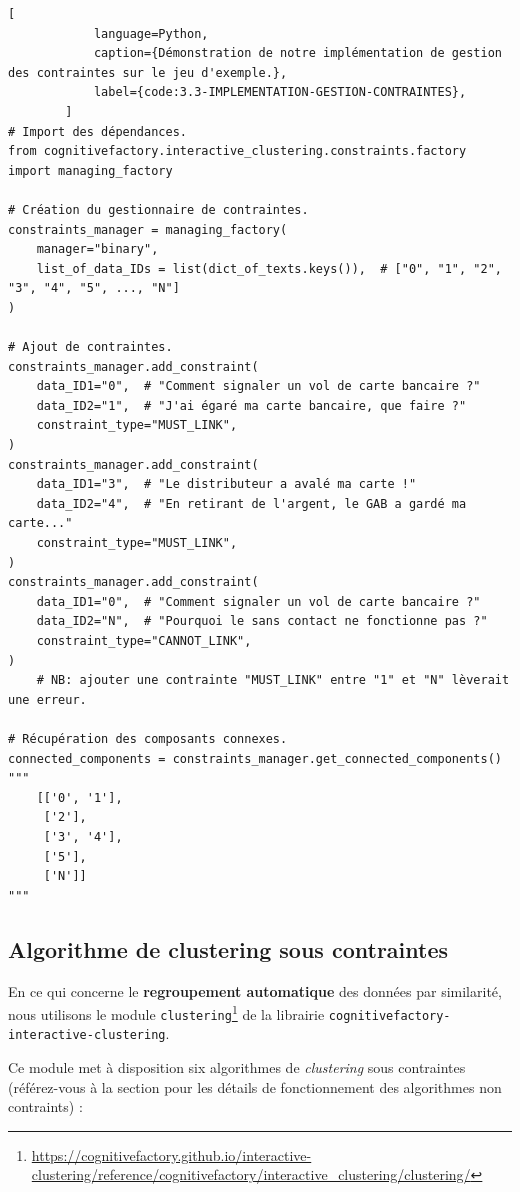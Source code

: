 		\begin{lstlisting}[
			language=Python,
			caption={Démonstration de notre implémentation de gestion des contraintes sur le jeu d'exemple.},
			label={code:3.3-IMPLEMENTATION-GESTION-CONTRAINTES},
		]
# Import des dépendances.
from cognitivefactory.interactive_clustering.constraints.factory import managing_factory

# Création du gestionnaire de contraintes.
constraints_manager = managing_factory(
    manager="binary",
    list_of_data_IDs = list(dict_of_texts.keys()),  # ["0", "1", "2", "3", "4", "5", ..., "N"]
)

# Ajout de contraintes.
constraints_manager.add_constraint(
    data_ID1="0",  # "Comment signaler un vol de carte bancaire ?"
    data_ID2="1",  # "J'ai égaré ma carte bancaire, que faire ?"
    constraint_type="MUST_LINK",
)
constraints_manager.add_constraint(
    data_ID1="3",  # "Le distributeur a avalé ma carte !"
    data_ID2="4",  # "En retirant de l'argent, le GAB a gardé ma carte..."
    constraint_type="MUST_LINK",
)
constraints_manager.add_constraint(
    data_ID1="0",  # "Comment signaler un vol de carte bancaire ?"
    data_ID2="N",  # "Pourquoi le sans contact ne fonctionne pas ?"
    constraint_type="CANNOT_LINK",
)
	# NB: ajouter une contrainte "MUST_LINK" entre "1" et "N" lèverait une erreur.

# Récupération des composants connexes.
connected_components = constraints_manager.get_connected_components()
"""
	[['0', '1'],
	 ['2'],
	 ['3', '4'],
	 ['5'],
	 ['N']]
"""
		\end{lstlisting}
		
		
		\subsection{Algorithme de clustering sous contraintes}
		\label{section:3.3.3-ALGORITHMES-CLUSTERING-SOUS-CONTRAINTES}
		
		En ce qui concerne le \textbf{regroupement automatique} des données par similarité, nous utilisons le module \texttt{clustering}\footnote{\url{https://cognitivefactory.github.io/interactive-clustering/reference/cognitivefactory/interactive_clustering/clustering/}} de la librairie \texttt{cognitivefactory-interactive-clustering}.
		
		Ce module met à disposition six algorithmes de \textit{clustering} sous contraintes (référez-vous à la section  pour les détails de fonctionnement des algorithmes non contraints) :
		
